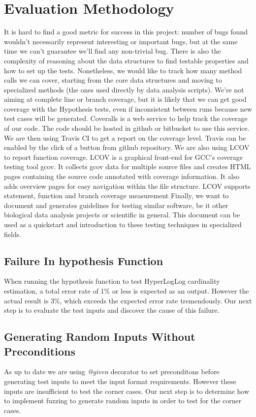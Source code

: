 \documentclass[preprint,nocopyrightspace]{sig-alternate}
\begin{document}
\section{Evaluation Methodology}
It is hard to find a good metric for success in this project:
number of bugs found wouldn't necessarily represent interesting or important bugs,
but at the same time we can't guarantee we'll find any non-trivial bug.
There is also the complexity of reasoning about the data structures to find testable properties and how to set up the tests.
Nonetheless,
we would like to track how many method calls we can cover,
starting from the core data structures and moving to specialized methods (the ones used directly by data analysis scripts).
We're not aiming at complete line or branch coverage,
but it is likely that we can get good coverage with the Hypothesis tests,
even if inconsistent between runs because new test cases will be generated.
Coveralls is a web service to help track the coverage of our code.
The code should be hosted in github or bitbucket to use this service.
We are then using Travis CI to get a report on the coverage level.
Travis can be enabled by the click of a button from github repository.
We are also using LCOV to report function coverage. 
LCOV is a graphical front-end for GCC's coverage testing tool gcov. 
It collects gcov data for multiple source files and creates HTML pages containing the 
source code annotated with coverage information. 
It also adds overview pages for easy navigation within the file structure. 
LCOV supports statement, function and branch coverage measurement
Finally,
we want to document and generates guidelines for testing similar software,
be it other biological data analysis projects or scientific in general.
This document can be used as a quickstart and introduction to these testing techniques in specialized fields.

\subsection{Failure In hypothesis Function}
When running the hypothesis function to test HyperLogLog cardinality estimation, 
a total error rate of 1\% or less is expected as an output. 
However the actual result is 3\%, 
which exceeds the expected error rate tremendously. 
Our next step is to evaluate the test inputs and discover the cause of this failure.

\subsection{Generating Random Inputs Without Preconditions}
As up to date we are using \emph{@given} decorator to set preconditons before generating test inputs to meet the input format requirements. 
However these inputs are insufficient to test the corner cases. 
Our next step is to determine how to implement fuzzing to generate random inputs in order to test for the corner cases.
\end{document}
